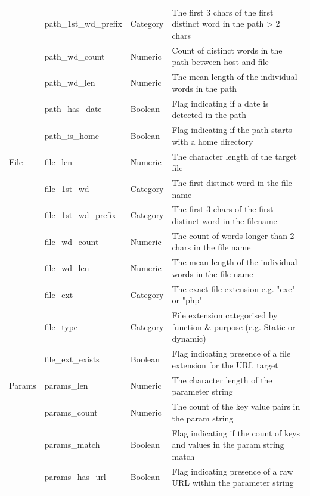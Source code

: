 \documentclass[sigconf]{acmart}
\begin{document}
\begin{table}
\begin{tabular}{|l|l|l|l|}
              &path\_1st\_wd\_prefix  &Category    &The first 3 chars of the first distinct word in the path > 2 chars   \\
              &path\_wd\_count        &Numeric     &Count of distinct words in the path between host and file   \\
              &path\_wd\_len          &Numeric     &The mean length of the individual words in the path  \\
              &path\_has\_date        &Boolean     &Flag indicating if a date is detected in the path  \\
              &path\_is\_home         &Boolean     &Flag indicating if the path starts with a home directory    \\
\midrule 
File          &file\_len              &Numeric     &The character length of the target file    \\
              &file\_1st\_wd          &Category    &The first distinct word in the file name  \\
              &file\_1st\_wd\_prefix  &Category    &The first 3 chars of the first distinct word in the filename  \\
              &file\_wd\_count        &Numeric     &The count of words longer than 2 chars in the file name   \\
              &file\_wd\_len          &Numeric     &The mean length of the individual words in the file name  \\
              &file\_ext              &Category    &The exact file extension e.g. "exe" or "php"    \\
              &file\_type             &Category    &File extension categorised by function \& purpose (e.g. Static or dynamic)   \\
              &file\_ext\_exists      &Boolean     &Flag indicating presence of a file extension for the URL target  \\
\midrule
Params        &params\_len            &Numeric     &The character length of the parameter string    \\
              &params\_count          &Numeric     &The count of the key value pairs in the param string    \\
              &params\_match          &Boolean     &Flag indicating if the count of keys and values in the param string match    \\
              &params\_has\_url       &Boolean     &Flag indicating presence of a raw URL within the parameter string   \\

\end{tabular}
\end{table}
\end{document}
